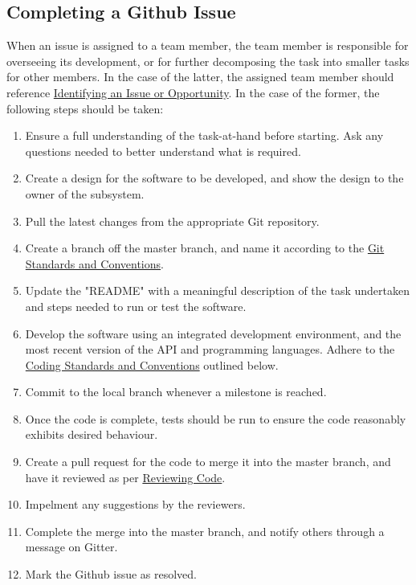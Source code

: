 \documentclass{article}
\begin{document}
\subsection{Completing a Github Issue}
\label{sec:github-issue}
When an issue is assigned to a team member, the team member is responsible for overseeing its development, or for further decomposing the task into smaller tasks for other members. In the case of the latter, the assigned team member should reference \hyperref[sec:issues-opportunity]{Identifying an Issue or Opportunity}. In the case of the former, the following steps should be taken:

\begin{enumerate}
\item Ensure a full understanding of the task-at-hand before starting. Ask any questions needed to better understand what is required.
\item Create a design for the software to be developed, and show the design to the owner of the subsystem.
\item Pull the latest changes from the appropriate Git repository.
\item Create a branch off the master branch, and name it according to the \hyperref[sec:git-conventions]{Git Standards and Conventions}.
\item Update the "README" with a meaningful description of the task undertaken and steps needed to run or test the software.
\item Develop the software using an integrated development environment, and the most recent version of the API and programming languages. Adhere to the \hyperref[sec:code-standards]{Coding Standards and Conventions} outlined below.
\item Commit to the local branch whenever a milestone is reached.
\item Once the code is complete, tests should be run to ensure the code reasonably exhibits desired behaviour.
\item Create a pull request for the code to merge it into the master branch, and have it reviewed as per \hyperref[sec:reviewing-code]{Reviewing Code}.
\item Impelment any suggestions by the reviewers.
\item Complete the merge into the master branch, and notify others through a message on Gitter.
\item Mark the Github issue as resolved.
\end{enumerate}
\end{document}
